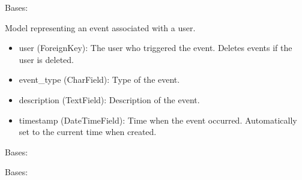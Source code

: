 \documentclass[letterpaper,10pt,english]{sphinxmanual}
\begin{document}

\begin{fulllineitems}
\label{\detokenize{modules/models:account.models.Event}}
\pysigstartsignatures
{}
\pysigstopsignatures
\sphinxAtStartPar
Bases: 

\sphinxAtStartPar
Model representing an event associated with a user.
\begin{description}
\begin{itemize}
\item {} 
\sphinxAtStartPar
user (ForeignKey): The user who triggered the event. Deletes events if the user is deleted.

\item {} 
\sphinxAtStartPar
event\_type (CharField): Type of the event.

\item {} 
\sphinxAtStartPar
description (TextField): Description of the event.

\item {} 
\sphinxAtStartPar
timestamp (DateTimeField): Time when the event occurred. Automatically set to the current time when created.

\end{itemize}

\end{description}

\begin{fulllineitems}
\label{\detokenize{modules/models:account.models.Event.DoesNotExist}}
\pysigstartsignatures
{}
\pysigstopsignatures
\sphinxAtStartPar
Bases: 

\end{fulllineitems}


\begin{fulllineitems}
\label{\detokenize{modules/models:account.models.Event.MultipleObjectsReturned}}
\pysigstartsignatures
{}
\pysigstopsignatures
\sphinxAtStartPar
Bases: 

\end{fulllineitems}


\end{fulllineitems}
\end{document}
